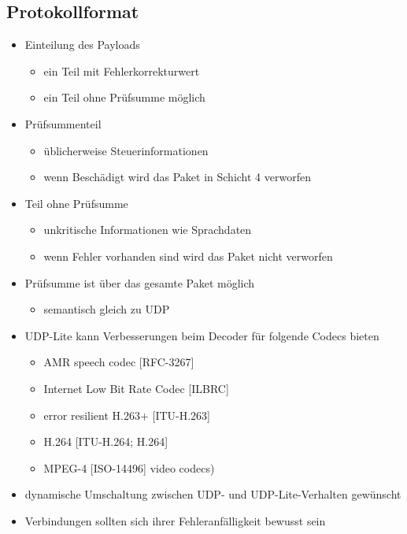 \documentclass{beamer}
\begin{document}
\subsection{Protokollformat}
\begin{frame}
\begin{itemize}
\item Einteilung des Payloads
	\begin{itemize}
	\item ein Teil mit Fehlerkorrekturwert
	\item ein Teil ohne Prüfsumme möglich
	\end{itemize}
\item Prüfsummenteil
	\begin{itemize}
	\item üblicherweise Steuerinformationen
	\item wenn Beschädigt wird das Paket in Schicht 4 verworfen
	\end{itemize}
\item Teil ohne Prüfsumme
	\begin{itemize}
	\item unkritische Informationen wie Sprachdaten
	\item wenn Fehler vorhanden sind wird das Paket nicht verworfen
	\end{itemize}
\item Prüfsumme ist über das gesamte Paket möglich
	\begin{itemize}
	\item semantisch gleich zu UDP
	\end{itemize}
\end{itemize}
\end{frame}


\begin{frame}
\begin{itemize}
\item UDP-Lite kann Verbesserungen beim Decoder für folgende Codecs bieten
	\begin{itemize}
	\item AMR speech codec [RFC-3267]
	\item Internet Low Bit Rate Codec [ILBRC]
	\item error resilient H.263+ [ITU-H.263]
	\item H.264 [ITU-H.264; H.264]
	\item MPEG-4 [ISO-14496] video codecs)
	\end{itemize}
\item dynamische Umschaltung zwischen UDP- und UDP-Lite-Verhalten gewünscht
\item Verbindungen sollten sich ihrer Fehleranfälligkeit bewusst sein
\end{itemize}
\end{frame}
\end{document}
